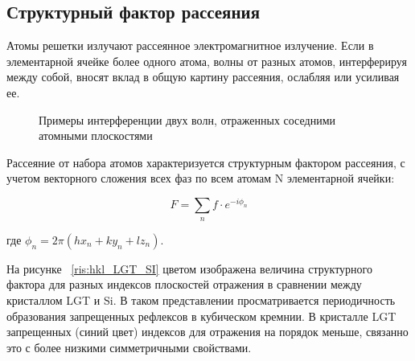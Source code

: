 \subsection{Структурный фактор рассеяния}
Атомы решетки излучают рассеянное электромагнитное излучение.
Если в элементарной ячейке более одного атома, волны от разных атомов,
 интерферируя между собой, вносят вклад в общую картину рассеяния,
 ослабляя или усиливая ее.

 \begin{figure}[h]
   \centering
   \hfill
   \caption{Примеры интерференции двух волн, отраженных соседними атомными плоскостями}
   \label{ris:interference_by_plate}
 \end{figure}

Рассеяние от набора атомов характеризуется структурным фактором рассеяния,
 с учетом векторного сложения всех фаз по всем атомам N элементарной ячейки:

 \begin{equation}
   F = \sum_{n} f \cdot e^{-i\phi_n}
  \end{equation}

  где $\phi_n = 2 \pi (hx_n+ky_n+lz_n)$.


На рисунке ~\ref{ris:hkl_LGT_SI} цветом изображена величина структурного фактора для разных
 индексов плоскостей отражения в сравнении между кристаллом LGT и Si.
 В таком представлении просматривается периодичность образования запрещенных
 рефлексов в кубическом кремнии. В кристалле LGT запрещенных (синий цвет)
  индексов для отражения на порядок меньше, связанно это с более низкими
  симметричными свойствами.

